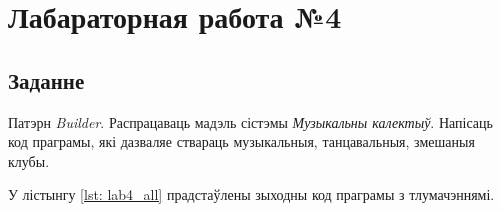 \section{Лабараторная работа №4}

\subsection{Заданне}

Патэрн \textit{Builder}.
Распрацаваць мадэль сістэмы \textit{Музыкальны калектыў}.
Напісаць код праграмы, які дазваляе ствараць музыкальныя, танцавальныя,
змешаныя клубы.

У лістынгу \ref{lst: lab4_all} прадстаўлены зыходны код праграмы з тлумачэннямі.


